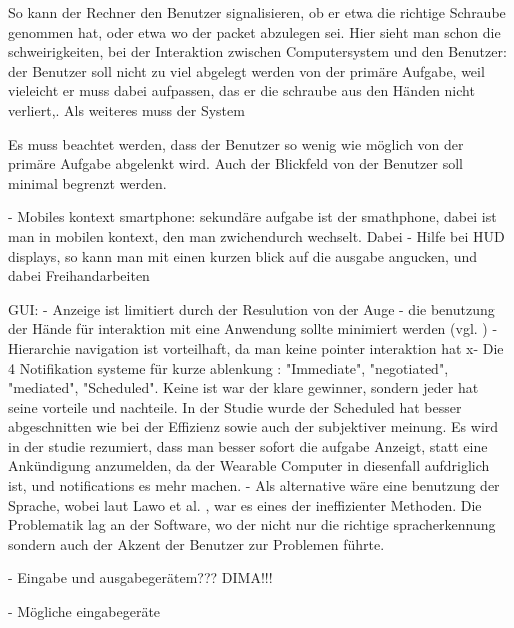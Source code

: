  So kann der Rechner den Benutzer signalisieren, ob er etwa die richtige Schraube genommen hat, oder etwa wo der packet abzulegen sei. Hier sieht man schon die schweirigkeiten, bei der Interaktion zwischen Computersystem und den Benutzer: der Benutzer soll nicht zu viel abgelegt werden von der primäre Aufgabe, weil vieleicht er muss dabei aufpassen, das er die schraube aus den Händen nicht verliert,. Als weiteres muss der System

 Es muss beachtet werden, dass der Benutzer so wenig wie möglich von der primäre Aufgabe abgelenkt wird. Auch der Blickfeld von der Benutzer soll minimal begrenzt werden.


- Mobiles kontext smartphone: sekundäre aufgabe ist der smathphone, dabei ist man in mobilen kontext, den man zwichendurch wechselt. Dabei 
- Hilfe bei HUD displays, so kann man mit einen kurzen blick auf die ausgabe angucken, und dabei Freihandarbeiten



GUI: 
-  Anzeige ist limitiert durch der Resulution von der Auge \cite[Seite 60]{Starner:2001eu}
- die benutzung der Hände für interaktion mit eine Anwendung sollte minimiert werden (vgl. \cite{Rekimoto:gu})
- Hierarchie navigation ist vorteilhaft, da man keine pointer interaktion hat \cite{Blasko:ug}
x- Die 4 Notifikation systeme für kurze ablenkung \cite{McFarlane:1999um}: "Immediate", "negotiated", "mediated", "Scheduled". Keine ist war der klare gewinner, sondern jeder hat seine vorteile und nachteile. In der Studie \cite{Nilsson:cq} wurde der Scheduled hat besser abgeschnitten wie bei der Effizienz sowie auch der subjektiver meinung. Es wird in der studie rezumiert, dass man besser sofort die aufgabe Anzeigt, statt eine Ankündigung anzumelden, da der Wearable Computer in diesenfall aufdriglich ist, und notifications es mehr machen.
- Als alternative wäre eine benutzung der Sprache, wobei laut Lawo et al. \cite{Lawo:2008gg}, war es eines der ineffizienter Methoden. Die Problematik lag an der Software, wo der nicht nur die richtige spracherkennung sondern auch der Akzent der Benutzer zur Problemen führte.

- Eingabe und ausgabegerätem??? DIMA!!!

- Mögliche eingabegeräte \cite{Witt:we}
